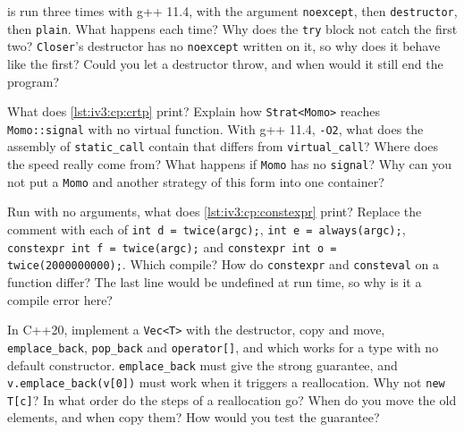 \begin{question}\label{iq:iv3:cpp:53}
 is run three times with g++ 11.4, with the argument \texttt{noexcept}, then \texttt{destructor}, then \texttt{plain}. What happens each time? Why does the \texttt{try} block not catch the first two? \texttt{Closer}'s destructor has no \texttt{noexcept} written on it, so why does it behave like the first? Could you let a destructor throw, and when would it still end the program?
\label{lst:iv3:cp:terminate}
\end{question}

\begin{question}\label{iq:iv3:cpp:54}
What does \cref{lst:iv3:cp:crtp} print? Explain how \texttt{Strat<Momo>} reaches \texttt{Momo::signal} with no virtual function. With g++ 11.4, \texttt{-O2}, what does the assembly of \texttt{static\_call} contain that differs from \texttt{virtual\_call}? Where does the speed really come from? What happens if \texttt{Momo} has no \texttt{signal}? Why can you not put a \texttt{Momo} and another strategy of this form into one container?
\label{lst:iv3:cp:crtp}
\end{question}

\begin{question}\label{iq:iv3:cpp:55}
Run with no arguments, what does \cref{lst:iv3:cp:constexpr} print? Replace the comment with each of \texttt{int d = twice(argc);}, \texttt{int e = always(argc);}, \texttt{constexpr int f = twice(argc);} and \texttt{constexpr int o = twice(2000000000);}. Which compile? How do \texttt{constexpr} and \texttt{consteval} on a function differ? The last line would be undefined at run time, so why is it a compile error here?
\label{lst:iv3:cp:constexpr}
\end{question}

\begin{question}\label{iq:iv3:cpp:56}
In C++20, implement a \texttt{Vec<T>} with the destructor, copy and move, \texttt{emplace\_back}, \texttt{pop\_back} and \texttt{operator[]}, and which works for a type with no default constructor. \texttt{emplace\_back} must give the strong guarantee, and \texttt{v.emplace\_back(v[0])} must work when it triggers a reallocation. Why not \texttt{new T[c]}? In what order do the steps of a reallocation go? When do you move the old elements, and when copy them? How would you test the guarantee?
\end{question}

